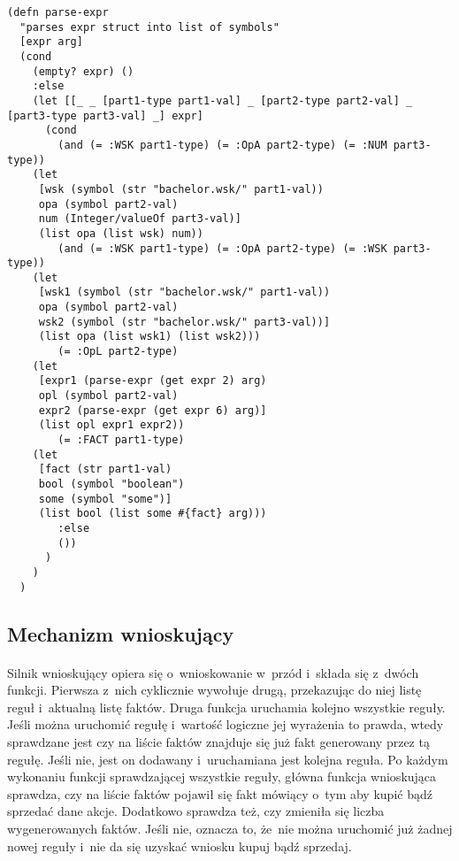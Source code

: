 \pagebreak

\begin{lstlisting}
(defn parse-expr 
  "parses expr struct into list of symbols"
  [expr arg]
  (cond
    (empty? expr) ()
    :else
    (let [[_ _ [part1-type part1-val] _ [part2-type part2-val] _ [part3-type part3-val] _] expr]
      (cond 
        (and (= :WSK part1-type) (= :OpA part2-type) (= :NUM part3-type)) 
	(let 
	 [wsk (symbol (str "bachelor.wsk/" part1-val))
	 opa (symbol part2-val)
	 num (Integer/valueOf part3-val)]
	 (list opa (list wsk) num))
        (and (= :WSK part1-type) (= :OpA part2-type) (= :WSK part3-type)) 
	(let
	 [wsk1 (symbol (str "bachelor.wsk/" part1-val))
	 opa (symbol part2-val)
	 wsk2 (symbol (str "bachelor.wsk/" part3-val))]
	 (list opa (list wsk1) (list wsk2)))
        (= :OpL part2-type) 
	(let
	 [expr1 (parse-expr (get expr 2) arg)
	 opl (symbol part2-val)
	 expr2 (parse-expr (get expr 6) arg)]
	 (list opl expr1 expr2))
        (= :FACT part1-type) 
	(let
	 [fact (str part1-val)
	 bool (symbol "boolean")
	 some (symbol "some")]
	 (list bool (list some #{fact} arg)))
        :else
        ())
      )
    )
  )
\end{lstlisting}

\subsection{Mechanizm wnioskujący}

\paragraph{}
Silnik wnioskujący opiera się o~wnioskowanie w~przód i~składa się z~dwóch funkcji. Pierwsza z~nich cyklicznie wywołuje drugą, przekazując do niej listę reguł i~aktualną listę faktów. Druga funkcja uruchamia kolejno wszystkie reguły. Jeśli można uruchomić regułę i~wartość logiczne jej wyrażenia to prawda, wtedy sprawdzane jest czy na liście faktów znajduje się już fakt generowany przez tą regułę. Jeśli nie, jest on dodawany i~uruchamiana jest kolejna reguła. Po każdym wykonaniu funkcji sprawdzającej wszystkie reguły, główna funkcja wnioskująca sprawdza, czy na liście faktów pojawił się fakt mówiący o~tym aby kupić bądź sprzedać dane akcje. Dodatkowo sprawdza też, czy zmieniła się liczba wygenerowanych faktów. Jeśli nie, oznacza to, że~nie można uruchomić już żadnej nowej reguły i~nie da się uzyskać wniosku kupuj bądź sprzedaj.

